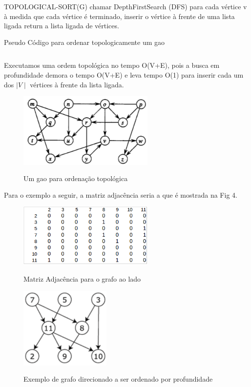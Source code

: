 \documentclass[a4paper,12pt]{article}
\begin{document}
\begin{algorithm}[H]
\SetAlgoLined
TOPOLOGICAL-SORT(G)\;
chamar DepthFirstSearch (DFS) para cada vértice v\;
à medida que cada vértice é terminado, inserir o vértice à frente de uma lista ligada\;
return a lista ligada de vértices.\;
\caption{Pseudo Código para ordenar topologicamente um gao}
\end{algorithm}

\begin{verbatim}

\end{verbatim} 
Executamos uma ordem topológica no tempo O(V+E), pois a busca em profundidade demora o tempo O(V+E) e leva tempo O(1) para inserir cada um dos $\mid V\mid$ vértices à frente da lista ligada.

\begin{figure}[h!]
	\centering
	\includegraphics[width=0.6\textwidth]{gao}
	\label{fig:gao}
	\caption{Um gao para ordenação topológica}
\end{figure}

Para o exemplo a seguir, a matriz adjacência seria a que é mostrada na Fig 4.

\begin{figure}[h!]
	\centering
	\includegraphics[width=0.6\textwidth]{matriz}
	\label{matriz}
	\caption{Matriz Adjacência para o grafo ao lado}
\end{figure}

\begin{figure}[h!]
	\centering
	\includegraphics[width=0.4\textwidth]{grafodirecionado}
	\label{fig:grafodirecionado}
	\caption{Exemplo de grafo direcionado a ser ordenado por profundidade}
\end{figure}
\end{document}
